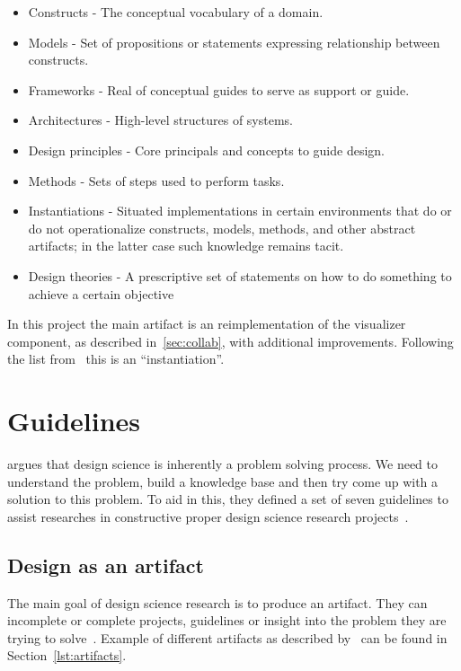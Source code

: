 \documentclass[../Main/thesis.tex]{subfiles}
\begin{document}
\begin{itemize}
\label{lst:artifacts}
    \item Constructs - The conceptual vocabulary of a domain.
    \item Models - Set of propositions or statements expressing relationship
        between constructs.
    \item Frameworks - Real of conceptual guides to serve as support or guide.
    \item Architectures - High-level structures of systems.
    \item Design principles - Core principals and concepts to guide design.
    \item Methods - Sets of steps used to perform tasks.
    \item Instantiations - Situated implementations in certain environments that do or do not
operationalize constructs, models, methods, and other abstract artifacts; in the
latter case such knowledge remains tacit.
    \item Design theories -  A prescriptive set of statements on how to do something to achieve a certain objective
\end{itemize}

In this project the main artifact is an reimplementation of the visualizer
component, as described in~\ref{sec:collab}, with additional improvements.
Following the list from~\citeauthor{Vaishnavi:2015:DSR:2807332} this is an
``instantiation''.

\section{Guidelines}%
\label{sec:guidelines}
\citeauthor{Hevner:2004:DSI:2017212.2017217} argues that design science is
inherently a problem solving process. We need to understand the problem, build
a knowledge base and then try come up with a solution to this problem. To aid in
this, they defined a set of seven guidelines to assist researches in
constructive proper design science research projects~\cite{Hevner:2004:DSI:2017212.2017217}.

\subsection*{Design as an artifact}%
\label{sub:design_as_an_artifact}
The main goal of design science research is to produce an artifact. They can
incomplete or complete projects, guidelines or insight into the problem they are
trying to solve~\cite{Hevner:2004:DSI:2017212.2017217}. Example of different artifacts as described by~\citeauthor{Vaishnavi:2015:DSR:2807332} can be found in Section~\ref{lst:artifacts}.
\end{document}
